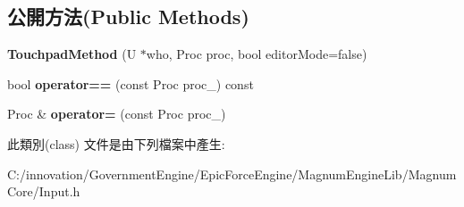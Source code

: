 \subsection*{公開方法(Public Methods)}
\begin{DoxyCompactItemize}
\item 
{\bfseries Touchpad\+Method} (U $\ast$who, Proc proc, bool editor\+Mode=false)\hypertarget{class_i_dream_sky_1_1_input_1_1_touchpad_method_ac04c2e97236e6830e938dc29a5c35da3}{}\label{class_i_dream_sky_1_1_input_1_1_touchpad_method_ac04c2e97236e6830e938dc29a5c35da3}

\item 
bool {\bfseries operator==} (const Proc proc\+\_\+) const \hypertarget{class_i_dream_sky_1_1_input_1_1_touchpad_method_a996dfb78a5636a32b79e8dab7598bf00}{}\label{class_i_dream_sky_1_1_input_1_1_touchpad_method_a996dfb78a5636a32b79e8dab7598bf00}

\item 
Proc \& {\bfseries operator=} (const Proc proc\+\_\+)\hypertarget{class_i_dream_sky_1_1_input_1_1_touchpad_method_a5a7593f6573a25d317cad868ffa6b629}{}\label{class_i_dream_sky_1_1_input_1_1_touchpad_method_a5a7593f6573a25d317cad868ffa6b629}

\end{DoxyCompactItemize}


此類別(class) 文件是由下列檔案中產生\+:\begin{DoxyCompactItemize}
\item 
C\+:/innovation/\+Government\+Engine/\+Epic\+Force\+Engine/\+Magnum\+Engine\+Lib/\+Magnum\+Core/Input.\+h\end{DoxyCompactItemize}
